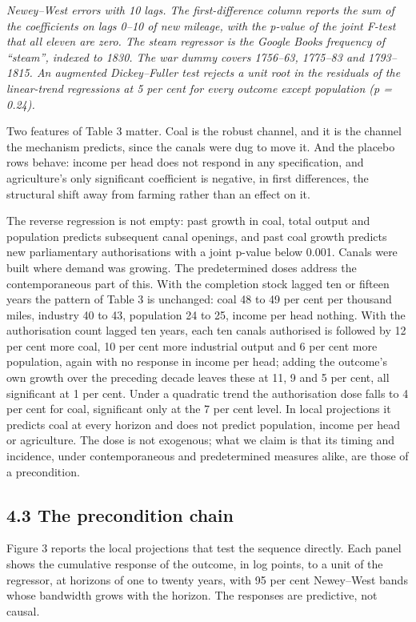 \documentclass[
  11pt,
]{article}
\begin{document}
\emph{Newey--West errors with 10 lags. The first-difference column
reports the sum of the coefficients on lags 0--10 of new mileage, with
the p-value of the joint F-test that all eleven are zero. The steam
regressor is the Google Books frequency of ``steam'', indexed to 1830.
The war dummy covers 1756--63, 1775--83 and 1793--1815. An augmented
Dickey--Fuller test rejects a unit root in the residuals of the
linear-trend regressions at 5 per cent for every outcome except
population (p = 0.24).}

Two features of Table 3 matter. Coal is the robust channel, and it is
the channel the mechanism predicts, since the canals were dug to move
it. And the placebo rows behave: income per head does not respond in any
specification, and agriculture's only significant coefficient is
negative, in first differences, the structural shift away from farming
rather than an effect on it.

The reverse regression is not empty: past growth in coal, total output
and population predicts subsequent canal openings, and past coal growth
predicts new parliamentary authorisations with a joint p-value below
0.001. Canals were built where demand was growing. The predetermined
doses address the contemporaneous part of this. With the completion
stock lagged ten or fifteen years the pattern of Table 3 is unchanged:
coal 48 to 49 per cent per thousand miles, industry 40 to 43, population
24 to 25, income per head nothing. With the authorisation count lagged
ten years, each ten canals authorised is followed by 12 per cent more
coal, 10 per cent more industrial output and 6 per cent more population,
again with no response in income per head; adding the outcome's own
growth over the preceding decade leaves these at 11, 9 and 5 per cent,
all significant at 1 per cent. Under a quadratic trend the authorisation
dose falls to 4 per cent for coal, significant only at the 7 per cent
level. In local projections it predicts coal at every horizon and does
not predict population, income per head or agriculture. The dose is not
exogenous; what we claim is that its timing and incidence, under
contemporaneous and predetermined measures alike, are those of a
precondition.

\subsection{4.3 The precondition chain}\label{the-precondition-chain}

Figure 3 reports the local projections that test the sequence directly.
Each panel shows the cumulative response of the outcome, in log points,
to a unit of the regressor, at horizons of one to twenty years, with 95
per cent Newey--West bands whose bandwidth grows with the horizon. The
responses are predictive, not causal.
\end{document}
